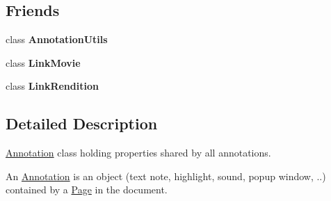 \subsection*{Friends}
\begin{DoxyCompactItemize}
\item 
\mbox{\label{class_poppler_1_1_annotation_a13daac1cbc1823e18498579fc26b344f}} 
class {\bfseries Annotation\+Utils}
\item 
\mbox{\label{class_poppler_1_1_annotation_a82099dad2133e65fd919529c37688d4e}} 
class {\bfseries Link\+Movie}
\item 
\mbox{\label{class_poppler_1_1_annotation_a42c733079a41829fb8ce58ccd61ad450}} 
class {\bfseries Link\+Rendition}
\end{DoxyCompactItemize}


\subsection{Detailed Description}
\hyperlink{class_poppler_1_1_annotation}{Annotation} class holding properties shared by all annotations. 

An \hyperlink{class_poppler_1_1_annotation}{Annotation} is an object (text note, highlight, sound, popup window, ..) contained by a \hyperlink{class_poppler_1_1_page}{Page} in the document.

